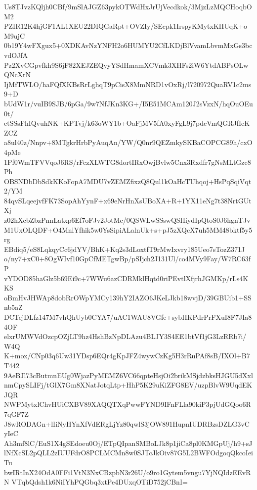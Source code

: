 Us8TJvzKQljh0CBf/9mSlAJGZ63pykOTWdHxJrUjVecdkok/3MjzLzMQCHoqbOM2
PZIR12K4hjGF1AL1XEU22DIQGaRpt+OVZIy/SEcpk1IrspyKMytxKHUqK+oM9ujC
0b19Y4wFXgux5+0XDKAvNzYNFH2o6HUMYU2CfLKDjBlVvamLbvmMxGs3bcvdOJfA
Pz2XvCGpvfkh9S6jF82XEJZEQyyYSdHmamXCVmk3XHFs2iW6YtdABPsOLwQNcXrN
IjMfTWLO/haFQfXKBsRrLghqT9pCisX8MmNRD1vOxRj/l720972QuaRV1c2ms9+D
bUdW1r/vuIB9SJB/6pGa/9w7NfJKn3KG+/I5E51MCAm120J2sVzxN/hqOuOEu0t/
ctSSsFhIQvuhNK+KPTvj/k63oWY1b+OaFjMV5fA0xyFgL9j7pdcVmQGRJfIcKZCZ
a8ul40z/Nnpv+8MTgkrHrbPyAuqAn/YW/Q0nr9QEZmkySKBaCOPCG89h/cxO4pMe
1Pf0WmTFVVqoJ6RS/rFczXLWTG8dortIRxOwjBvlw5Cnx3Rxdfr7gNsMLtGzc8Ph
OBSNDbDbSdkKKoFopA7MDU7vZEMZfixzQ8Qul1kOaHcTUhqoj+HsPqSqiVqt2/YM
84qvSLqeejvfFK73SopAhYynF+x69eNrHnXsUBoXA+R+1YX11eNg7t38NrtGUtXj
z02hXcbZbzPnnLatxp6Ef7oFJv2JotMc/0QSWLwSSswQSHiydIpQtoS0J6hgnTJv
M1UxOLQDF+O4MnlYfhik5w0YsSipiALalnUk+s+pJ5zXQcX7uh5MM48bktf5y5rg
EBdiq5/eS8LqkqyCc6jdYV/BhK+Kq2s3dLoxtfT9rMwIxvry185Ueo7sTozZ371J
o/ny7+xC0+8OgWIvf10GpCfMETgwBp/pSIjch2J131Ul/co4MVy9Fay/W7RC63fP
vYDOD85haGlz5b69Ei9c+7WWu6azCDRMklHqtd0riPEvtlXfjrhJGMKp/rLs4KKS
oBmHvJHWAp8dobRrOWpYMCy139hY2IAZO6JKeLJkb18wvjD/39GBUib1+SSnb5aZ
DCTejDLfz147M7vhQhUyb0CYA7/uAC1WAU8VGfe+sybHKPdrPrFXuI8F7JIa84OF
elxrUMWVdOzcpOZjLT9hz4HshBzNpDLAzu4BLJY3S4EE1btVf1jG3LzRRb7i/W4Q
K+mox/CNp03q6Uw31YDsp6EQr4gKpJFZ4wywCzKg5H3rRuPAf8sB/IXOl+B7T442
9AeBJl73cButmnEUg0WjazPyMEMZ6VC66qpteHsjOi2brikMSjdzbksHJGU5dXxl
nmCpySLIFj/tGlX7Gm8XNatJotqLtp+HhP5K29uKiZFG8EV/uzpBlvW9UqdEKJQR
NWPMytxlChvHUiCXBV89XAQQTXqPwwFYND9IFnFLla90kiP3pjUdGQoo6R7qGF7Z
J8wRODAGn+lIiNyHYnXfVdERgLjYz80qwlS3jOW891HupnIUDRBzsDZLG3vCyIeC
Ah3mf8lC/EuS1X4gSEdoeu0Oj/ETpQIpanSMBoLJk8p1jiCa8pl0KMGpUj/h9+sJ
lNfXcSL2pQLL2zIUUFdrO8PCLMCMn8w0SJTcJkOiv87G5L2BWFOdgoqQkcoIeiTu
bwIRtInX24OdA0FFi1VtN3NxCBzpbN3r26U/o9ro1Gytem5vngu7YjNQIdzEEvRN
VTqbQdsh1k6NiIYhPQGbq3xtPe4DUxqOTiD752jCBnI=
